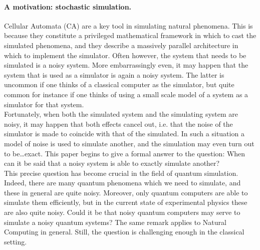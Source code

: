 \documentclass[submission]{fundam}
\begin{document}
\paragraph{A motivation: stochastic simulation.} Cellular Automata (CA) are a key tool in simulating natural phenomena. This is because they constitute a privileged mathematical framework in which to cast the simulated phenomena, and they describe a massively parallel architecture in which to implement the simulator. 
Often however, the system that needs to be simulated is a noisy system. More embarrassingly even, it may happen that the system that is used as a simulator is again a noisy system. The latter is uncommon if one thinks of a classical computer as the simulator, but quite common for instance if one thinks of using a small scale model of a system as a simulator for that system.\\
Fortunately, when both the simulated system and the simulating system are noisy, it may happen that both effects cancel out, i.e. that the noise of the simulator is made to coincide with that of the simulated. In such a situation a model of noise is used to simulate another, and the simulation may even turn out to be\ldots exact. This paper begins to give a formal answer to the question: When can it be said that a noisy system is able to exactly simulate another?\\
This precise question has become crucial in the field of quantum simulation. Indeed, there are many quantum phenomena which we need to simulate, and these in general are quite noisy. Moreover, only quantum computers are able to simulate them efficiently, but in the current state of experimental physics these are also quite noisy. Could it be that noisy quantum computers may serve to simulate a noisy quantum systems? The same remark applies to Natural Computing in general. Still, the question is challenging enough in the classical setting.
\end{document}
